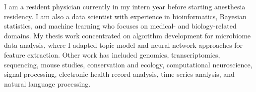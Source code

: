 

\begin{cvparagraph}

I am a resident physician currently in my intern year before starting anesthesia residency. I am also a data scientist with experience in bioinformatics, Bayesian statistics, and machine learning who focuses on medical- and biology-related domains. My thesis work concentrated on algorithm development for microbiome data analysis, where I adapted topic model and neural network approaches for feature extraction. Other work has included genomics, transcriptomics, sequencing, mouse studies, conservation and ecology, computational neuroscience, signal processing, electronic health record analysis, time series analysis, and natural language processing. 
\end{cvparagraph}